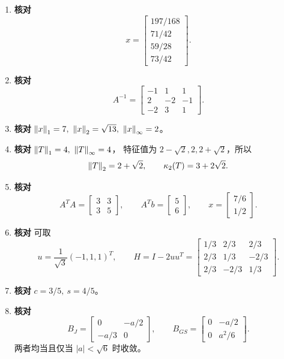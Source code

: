 \documentclass{article}
\newcommand{\answertag}{\textcolor{green!45!black}{\textbf{核对}}}
\begin{document}
\begin{enumerate}
  \item \answertag{}
  \[
    x=\begin{bmatrix}197/168\\71/42\\59/28\\73/42\end{bmatrix}.
  \]

  \item \answertag{}
  \[
    A^{-1}=\begin{bmatrix}-1&1&1\\2&-2&-1\\-2&3&1\end{bmatrix}.
  \]

  \item \answertag{} $\norm{x}_1=7,\ \norm{x}_2=\sqrt{13},\ \norm{x}_\infty=2$。

  \item \answertag{} $\left\| T \right\|_1=4,\ \left\| T \right\|_\infty=4$，
  特征值为 $2-\sqrt2,2,2+\sqrt2$，所以
  \[
    \left\| T \right\|_2=2+\sqrt2,\qquad \kappa_2(T)=3+2\sqrt2.
  \]

  \item \answertag{}
  \[
    A^TA=\begin{bmatrix}3&3\\3&5\end{bmatrix},\qquad
    A^Tb=\begin{bmatrix}5\\6\end{bmatrix},\qquad
    x=\begin{bmatrix}7/6\\1/2\end{bmatrix}.
  \]

  \item \answertag{} 可取
  \[
    u=\frac{1}{\sqrt3}(-1,1,1)^T,\qquad
    H=I-2uu^T=
    \begin{bmatrix}
      1/3&2/3&2/3\\
      2/3&1/3&-2/3\\
      2/3&-2/3&1/3
    \end{bmatrix}.
  \]

  \item \answertag{} $c=3/5,\ s=4/5$。

  \item \answertag{}
  \[
    B_J=\begin{bmatrix}0&-a/2\\-a/3&0\end{bmatrix},\qquad
    B_{GS}=\begin{bmatrix}0&-a/2\\0&a^2/6\end{bmatrix}.
  \]
  两者均当且仅当 $|a|<\sqrt6$ 时收敛。


\end{enumerate}
\end{document}
